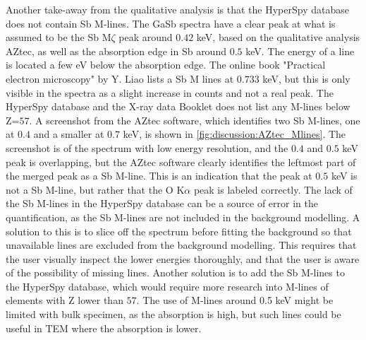 Another take-away from the qualitative analysis is that the HyperSpy database does not contain Sb M-lines.
The GaSb spectra have a clear peak at what is assumed to be the Sb M$\zeta$ peak around $0.42$ keV, based on the qualitative analysis AZtec, as well as the absorption edge in Sb around $0.5$ keV.
The energy of a line is located a few eV below the absorption edge.
The online book "Practical electron microscopy" by Y. Liao \cite{liao2006practical} lists a Sb M lines at $0.733$ keV, but this is only visible in the spectra as a slight increase in counts and not a real peak.
The HyperSpy database and the X-ray data Booklet \cite{thompson_x-ray_2004} does not list any M-lines below Z=$57$.
A screenshot from the AZtec software, which identifies two Sb M-lines, one at $0.4$ and a smaller at $0.7$ keV, is shown in \cref{fig:discussion:AZtec_Mlines}.
The screenshot is of the spectrum with low energy resolution, and the $0.4$ and $0.5$ keV peak is overlapping, but the AZtec software clearly identifies the leftmost part of the merged peak as a Sb M-line.
This is an indication that the peak at $0.5$ keV is not a Sb M-line, but rather that the O K$\alpha$ peak is labeled correctly.
The lack of the Sb M-lines in the HyperSpy database can be a source of error in the quantification, as the Sb M-lines are not included in the background modelling.
A solution to this is to slice off the spectrum before fitting the background so that unavailable lines are excluded from the background modelling.
This requires that the user visually inspect the lower energies thoroughly, and that the user is aware of the possibility of missing lines.
Another solution is to add the Sb M-lines to the HyperSpy database, which would require more research into M-lines of elements with Z lower than $57$.
The use of M-lines around 0.5 keV might be limited with bulk specimen, as the absorption is high, but such lines could be useful in TEM where the absorption is lower.

